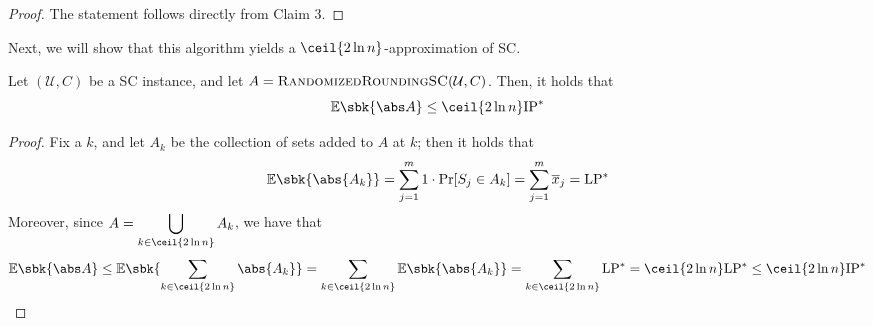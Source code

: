 \documentclass[a4paper, 12pt]{report}
\begin{document}
\begin{proof}

        The statement follows directly from Claim 3.
    \end{proof}

    Next, we will show that this algorithm yields  a $\ceil{2 \ln n}$-approximation of SC.

    \begin{framedlem}{}
        Let $(\mathcal U, C)$ be a SC instance, and let $A = \textsc{RandomizedRoundingSC}(\mathcal U, C)$. Then, it holds that $$\mathbb E \sbk{\abs A} \le \ceil{2 \ln n} \mathrm{IP}^*$$
    \end{framedlem}

    \begin{proof}
        Fix a  $k$, and let $A_k$ be the collection of sets added to $A$ at  $k$; then it holds that $$\mathbb E \sbk{\abs{A_k}} = \sum_{j = 1}^m {1 \cdot \Pr[S_j \in A_k]} = \sum_{j = 1}^m{\overline x_j} = \mathrm{LP^*}$$ Moreover, since $\displaystyle A = \bigcup_{k \in \ceil{2 \ln n}}{A_k}$, we have that $$\mathbb E \sbk{\abs A} \le \mathbb E \sbk{\sum_{k \in \ceil{2 \ln n}}{\abs{A_k}}} = \sum_{k \in \ceil {2 \ln n}}{\mathbb E \sbk{\abs{A_k}}} = \sum_{k \in \ceil{2 \ln n}}{\mathrm{LP^*}} = \ceil{2 \ln n} \mathrm{LP^*} \le \ceil{2 \ln n} \mathrm{IP^*}$$
    \end{proof}
\end{document}
